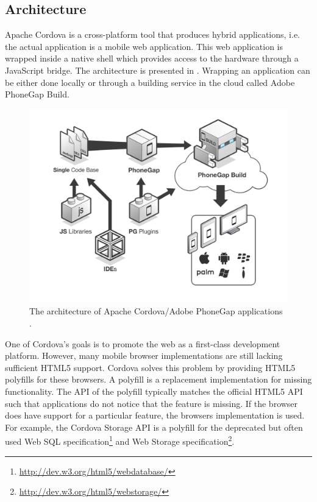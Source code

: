 \subsection{Architecture}
\label{sec:cordova:architecture}

Apache Cordova is a cross-platform tool that produces hybrid applications, i.e. the actual application is a mobile web application. This web application is wrapped inside a native shell which provides access to the hardware through a JavaScript bridge. The architecture is presented in . Wrapping an application can be either done locally or through a building service in the cloud called Adobe PhoneGap Build.

\begin{figure}
    \begin{center}
        \includegraphics[width=.8\textwidth]{figs/cordova-architecture.png}
        \caption{The architecture of Apache Cordova/Adobe PhoneGap applications \cite{PhoneGap:Overview}.}
        \label{fig:cordova:architecture}
    \end{center}
\end{figure}

One of Cordova's goals is to promote the web as a first-class development platform. However, many mobile browser implementations are still lacking sufficient HTML5 support. Cordova solves this problem by providing HTML5 polyfills for these browsers. A polyfill is a replacement implementation for missing functionality. The API of the polyfill typically matches the official HTML5 API such that applications do not notice that the feature is missing. If the browser does have support for a particular feature, the browsers implementation is used. For example, the Cordova Storage API is a polyfill for the deprecated but often used Web SQL specification\footnote{\url{http://dev.w3.org/html5/webdatabase/}} and Web Storage specification\footnote{\url{http://dev.w3.org/html5/webstorage/}}. 

